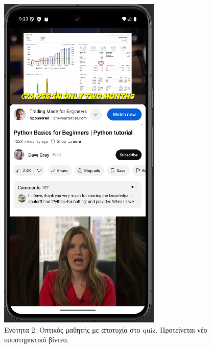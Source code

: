 \documentclass[11pt]{report}
\begin{document}
\begin{figure}[H]
  \centering
  \includegraphics[width=\linewidth, height=0.35\textheight, keepaspectratio]{Figures/εικόνα (5).png}
  \caption{Ενότητα 2: Οπτικός μαθητής με αποτυχία στο quiz. Προτείνεται νέο υποστηρικτικό βίντεο.}
\end{figure}
\end{document}

